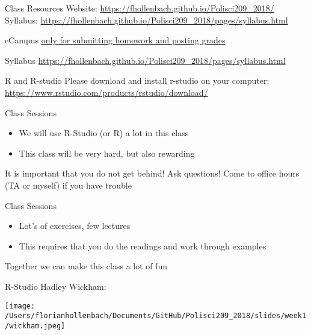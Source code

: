 \documentclass[presentation]{beamer}
\begin{document}
\begin{frame}[label={sec:org9d24507}]{Class Resources}
Website: \url{https://fhollenbach.github.io/Polisci209\_2018/}
Syllabus: \url{https://fhollenbach.github.io/Polisci209\_2018/pages/syllabus.html}

eCampus \uline{\uline{only for submitting homework and posting grades}}
\end{frame}

\begin{frame}[label={sec:orgf55da46}]{Syllabus}
\url{https://fhollenbach.github.io/Polisci209\_2018/pages/syllabus.html}
\end{frame}


\begin{frame}[label={sec:org866cfc8}]{R and R-studio}
Please download and install r-studio on your computer:
\url{https://www.rstudio.com/products/rstudio/download/}
\end{frame}

\begin{frame}[label={sec:org4331190}]{Class Sessions}
\begin{itemize}
\item We will use R-Studio (or R) a lot in this class
\item This class will be very hard, but also rewarding
\end{itemize}

\begin{alertblock}{It is important that you do not get behind!}
Ask questions! Come to office hours (TA or myself) if you have trouble
\end{alertblock}
\end{frame}

\begin{frame}[label={sec:orgff4c814}]{Class Sessions}
\begin{itemize}
\item Lot's of exercises, few lectures
\item This requires that you do the readings and work through examples
\end{itemize}

\begin{alertblock}{Together we can make this class a lot of fun}
\end{alertblock}
\end{frame}


\begin{frame}[label={sec:org6611d36}]{R-Studio}
Hadley Wickham:
\begin{center}
\texttt{[image: /Users/florianhollenbach/Documents/GitHub/Polisci209\_2018/slides/week1/wickham.jpeg]}
\end{center}
\end{frame}
\end{document}
